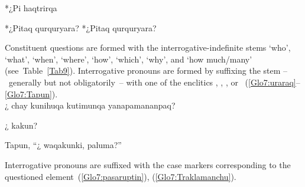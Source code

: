 %
{*¿Pi haqtrirqa}%
{}%
{}{}%

%
{*¿Pitaq qurquryara? *¿Pitaq qurquryara?}%
{}%
{}{}%

Constituent questions are formed with the interrogative-indefinite stems  ‘who’,  ‘what’,  ‘when’,  ‘where’,  ‘how’,  ‘which’,  ‘why’, and  ‘how much/many’ (see~Table~\ref{Tab9}). Interrogative pronouns are formed by suffixing the stem --~generally but not obligatorily~-- with one of the enclitics , , ,  or ~(\ref{Glo7:uraraq}--\ref{Glo7:Tapun}).\\

%
{¿ chay kunihuqa kutimunqa yanapamananpaq?}%
{}%
{}{}%

%
{¿ kakun?}%
{}%
{}{}%

%
{Tapun, “¿ waqakunki, paluma?”}%
{}%
{}{}%

\noindent
Interrogative pronouns are suffixed with the case markers corresponding to the questioned element~(\ref{Glo7:pasaruptin}), (\ref{Glo7:Traklamanchu}).\\


